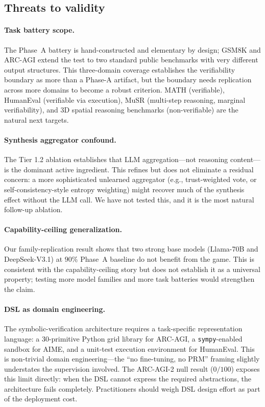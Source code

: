 \documentclass[11pt]{amsart}
\newcommand\1{{\mathds{1}}}
\theoremstyle{definition}
\theoremstyle{remark}
\numberwithin{equation}{section}
\begin{document}
\subsection{Threats to validity}\label{sec:threats}

\paragraph{Task battery scope.}
The Phase~A battery is hand-constructed and elementary by design; GSM8K and ARC-AGI extend the test to two standard public benchmarks with very different output structures.
This three-domain coverage establishes the verifiability boundary as more than a Phase-A artifact, but the boundary needs replication across more domains to become a robust criterion.
MATH \cite{Hendrycks2021MATH} (verifiable), HumanEval \cite{Chen2021HumanEval} (verifiable via execution), MuSR \cite{Sprague2024MuSR} (multi-step reasoning, marginal verifiability), and 3D spatial reasoning benchmarks (non-verifiable) are the natural next targets.

\paragraph{Synthesis aggregator confound.}
The Tier 1.2 ablation establishes that LLM aggregation---not reasoning content---is the dominant active ingredient.
This refines but does not eliminate a residual concern: a more sophisticated unlearned aggregator (e.g., trust-weighted vote, or self-consistency-style entropy weighting) might recover much of the synthesis effect without the LLM call.
We have not tested this, and it is the most natural follow-up ablation.

\paragraph{Capability-ceiling generalization.}
Our family-replication result shows that two strong base models (Llama-70B and DeepSeek-V3.1) at $90\%$ Phase~A baseline do not benefit from the game.
This is consistent with the capability-ceiling story but does not establish it as a universal property; testing more model families and more task batteries would strengthen the claim.

\paragraph{DSL as domain engineering.}
The symbolic-verification architecture requires a task-specific representation language: a $30$-primitive Python grid library for ARC-AGI, a \texttt{sympy}-enabled sandbox for AIME, and a unit-test execution environment for HumanEval.
This is non-trivial domain engineering---the ``no fine-tuning, no PRM'' framing slightly understates the supervision involved.
The ARC-AGI-2 null result ($0/100$) exposes this limit directly: when the DSL cannot express the required abstractions, the architecture fails completely.
Practitioners should weigh DSL design effort as part of the deployment cost.
\end{document}
